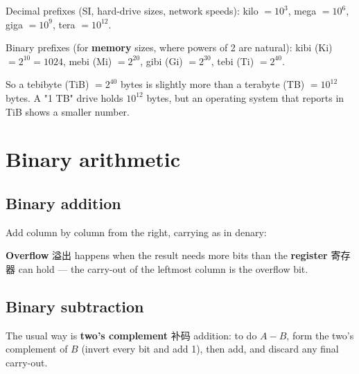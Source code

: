 \documentclass[11pt]{article}
\begin{document}
Decimal prefixes (SI, hard-drive sizes, network speeds): kilo $= 10^{3}$, mega $= 10^{6}$, giga $= 10^{9}$, tera $= 10^{12}$.

Binary prefixes (for \textbf{memory} sizes, where powers of 2 are natural): kibi (Ki) $= 2^{10} = 1024$, mebi (Mi) $= 2^{20}$, gibi (Gi) $= 2^{30}$, tebi (Ti) $= 2^{40}$.

So a tebibyte (TiB) $= 2^{40}$ bytes is slightly more than a terabyte (TB) $= 10^{12}$ bytes. A "1 TB" drive holds $10^{12}$ bytes, but an operating system that reports in TiB shows a smaller number.

\section*{Binary arithmetic}

\subsection*{Binary addition}

Add column by column from the right, carrying as in denary:

\begin{center}
\end{center}

\textbf{Overflow} 溢出 happens when the result needs more bits than the \textbf{register} 寄存器 can hold — the carry-out of the leftmost column is the overflow bit.

\subsection*{Binary subtraction}

The usual way is \textbf{two's complement} 补码 addition: to do $A - B$, form the two's complement of $B$ (invert every bit and add 1), then add, and discard any final carry-out.
\end{document}
